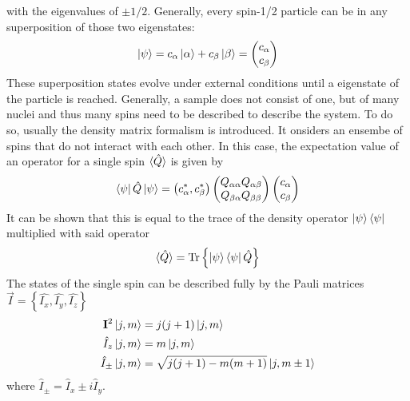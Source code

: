            with the eigenvalues of $\pm 1/2$.  Generally, every spin-1/2 particle can be in any superposition of those two eigenstates:
            \begin{equation}
                \ket\psi = c_\alpha \ket\alpha + c_\beta \ket \beta = \begin{pmatrix} c_\alpha \\
                c_\beta\end{pmatrix}
            \end{equation}
            These superposition states evolve under external conditions until a eigenstate of the particle
            is reached. Generally, a sample does not consist of one, but of many nuclei and thus many spins need to be
            described to describe the system. To do so, usually the density matrix formalism is introduced.
            It onsiders an ensembe of spins that do not interact with each other. In this case, the
            expectation value of an operator for a single spin $\braket{\hat Q}$ is given by
            \begin{equation}
            \bra\psi\hat Q\ket\psi = \left( c_\alpha^*, c_\beta^*\right)
            \begin{pmatrix}
                Q_{\alpha\alpha} Q_{\alpha\beta}\\
                Q_{\beta\alpha} Q_{\beta\beta}
            \end{pmatrix}
            \begin{pmatrix}
                c_\alpha\\
                c_\beta
            \end{pmatrix}
            \end{equation}
            It can be shown that this is equal to the trace of the density operator
            $\ket\psi\bra\psi$ multiplied with said operator
            \begin{equation}
                \braket{\hat Q} = \operatorname{Tr} \left\{\ket\psi\bra\psi\hat Q\right\}
            \end{equation}
            The states of the single spin can be described fully by the Pauli matrices $\vec{I} = \left\{ \hat{I_x}, \hat{I_y}, \hat{I_z}\right\}$
            \begin{align*}
                \mathbf{I}^2 \ket{j,m} &= j(j+1)\ket{j,m}\\
                \hat{I}_z \ket{j,m} &= m\ket{j,m}\\
                \hat{I}_\pm \ket{j,m} &= \sqrt{j(j+1)-m(m+1)}\ket{j,m\pm1}
            \end{align*}
            where $ \hat{I}_\pm = \hat{I}_x\pm i \hat{I}_y$.

